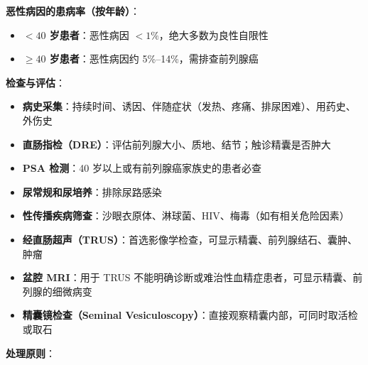 \documentclass[12pt,a4paper,twoside]{ctexbook}
\begin{document}
\vspace{0.5em}
\noindent\textbf{恶性病因的患病率（按年龄）}：
\begin{itemize}[leftmargin=2cm]
	\item \textbf{$<40$ 岁患者}：恶性病因 $<1\%$，绝大多数为良性自限性
	\item \textbf{$\geq 40$ 岁患者}：恶性病因约 5\%--14\%，需排查前列腺癌
\end{itemize}

\vspace{0.5em}
\noindent\textbf{检查与评估}：

\begin{itemize}[leftmargin=2cm]
	\item \textbf{病史采集}：持续时间、诱因、伴随症状（发热、疼痛、排尿困难）、用药史、外伤史
	\item \textbf{直肠指检（DRE）}：评估前列腺大小、质地、结节；触诊精囊是否肿大
	\item \textbf{PSA 检测}：40 岁以上或有前列腺癌家族史的患者必查
	\item \textbf{尿常规和尿培养}：排除尿路感染
	\item \textbf{性传播疾病筛查}：沙眼衣原体、淋球菌、HIV、梅毒（如有相关危险因素）
	\item \textbf{经直肠超声（TRUS）}：首选影像学检查，可显示精囊、前列腺结石、囊肿、肿瘤
	\item \textbf{盆腔 MRI}：用于 TRUS 不能明确诊断或难治性血精症患者，可显示精囊、前列腺的细微病变
	\item \textbf{精囊镜检查（Seminal Vesiculoscopy）}：直接观察精囊内部，可同时取活检或取石
\end{itemize}

\vspace{0.5em}
\noindent\textbf{处理原则}：
\end{document}
